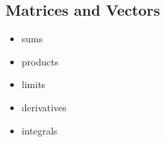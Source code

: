         \subsection{Matrices and Vectors}
        \label{Matrices and Vectors}
        
        \begin{framed}
            \begin{itemize}
                \item{sums}
                \item{products}
                \item{limits}
                \item{derivatives}
                \item{integrals}
            \end{itemize}
        \end{framed}


%        
%
%
% 
%    
%
%

